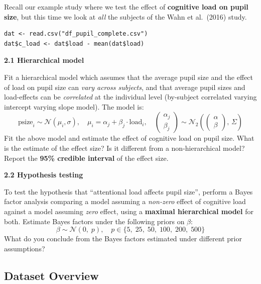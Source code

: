 \documentclass[12pt,a4paper]{article}
\begin{document}
\begin{tcolorbox}[qbox, title={Question}]
Recall our example study where we test the effect of \textbf{cognitive load on pupil size}, but
this time we look at \emph{all} the subjects of the Wahn et al.\ (2016) study.
\begin{lstlisting}[numbers=none, frame=none, backgroundcolor=\color{qbox_bg},
                   basicstyle=\ttfamily\small\color{code_fg}, aboveskip=2pt, belowskip=2pt]
dat <- read.csv("df_pupil_complete.csv")
dat$c_load <- dat$load - mean(dat$load)
\end{lstlisting}
\medskip
\textbf{2.1 Hierarchical model}

Fit a hierarchical model which assumes that the average pupil size and the effect of load on
pupil size can \emph{vary across subjects}, and that average pupil sizes and load-effects can be
\emph{correlated} at the individual level (by-subject correlated varying intercept varying slope
model). The model is:
\[
  \text{psize}_i \sim \mathcal{N}(\mu_i, \sigma), \quad
  \mu_i = \alpha_j + \beta_j \cdot \text{load}_i, \quad
  \begin{pmatrix}\alpha_j\\\beta_j\end{pmatrix}
  \sim \mathcal{N}_2\!\left(
    \begin{pmatrix}\alpha\\\beta\end{pmatrix},\,
    \Sigma
  \right)
\]
Fit the above model and estimate the effect of cognitive load on pupil size. What is the
estimate of the effect size? Is it different from a non-hierarchical model? Report the
\textbf{95\% credible interval} of the effect size.

\medskip
\textbf{2.2 Hypothesis testing}

To test the hypothesis that ``attentional load affects pupil size'', perform a Bayes factor
analysis comparing a model assuming a \emph{non-zero} effect of cognitive load against a model
assuming \emph{zero} effect, using a \textbf{maximal hierarchical model} for both. Estimate
Bayes factors under the following priors on $\beta$:
\[
  \beta \sim \mathcal{N}(0,\;p), \quad p \in \{5,\;25,\;50,\;100,\;200,\;500\}
\]
What do you conclude from the Bayes factors estimated under different prior assumptions?
\end{tcolorbox}

\vspace{6pt}

\subsection{Dataset Overview}
\end{document}
